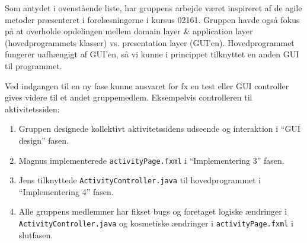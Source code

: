 Som antydet i ovenstående liste, har gruppens arbejde været inspireret af de agile metoder præsenteret i forelæsningerne i kursus 02161. Gruppen havde også fokus på at overholde opdelingen mellem domain layer \& application layer (hovedprogrammets klasser) vs. presentation layer  (GUI’en). Hovedprogrammet fungerer uafhængigt af GUI’en, så vi kunne i princippet tilknyttet en anden GUI til programmet.

Ved indgangen til en ny fase kunne ansvaret for fx en test eller GUI controller  gives videre til et andet gruppemedlem. Eksempelvis controlleren til aktivitetssiden:

\begin{enumerate}
\item Gruppen designede kollektivt aktivitetssidens udseende og interaktion i “GUI design” fasen.
\item Magnus implementerede \texttt{activityPage.fxml} i “Implementering 3” fasen.
\item Jens tilknyttede \texttt{ActivityController.java} til hovedprogrammet i “Implementering 4” fasen.
\item Alle gruppens medlemmer har fikset bugs og foretaget logiske ændringer i \texttt{ActivityController.java} og kosmetiske  ændringer i \texttt{activityPage.fxml} i slutfasen.
\end{enumerate}
